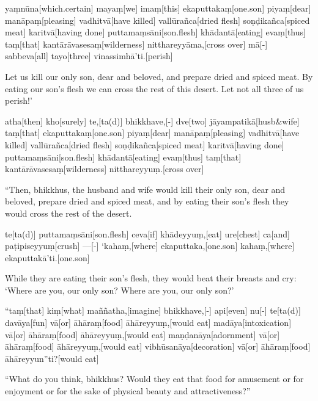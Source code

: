 \begin{samepage}
\begingl[glneveryline={\PaliGlossA,\PaliGlossB}]
yaṃnūna[which.certain] mayaṃ[we] imaṃ[this] ekaputtakaṃ[one.son] piyaṃ[dear] manāpaṃ[pleasing] vadhitvā[have killed] vallūrañca[dried flesh] soṇḍikañca[spiced meat] karitvā[having done] puttamaṃsāni[son.flesh] khādantā[eating] evaṃ[thus] taṃ[that] kantārāvasesaṃ[wilderness] nitthareyyāma,[cross over] mā[-] sabbeva[all] tayo[three] vinassimhā’ti.[perish]
\endgl
\nopagebreak
\linespread{0.5}
\begin{spacin}{0.2}
{\PaliGlossFT Let us kill our only son, dear and beloved, and prepare dried and spiced meat.  By eating our son’s flesh we can cross the rest of this desert.  Let not all three of us perish!’}
\end{spacin}
\vskip 12pt
\end{samepage}
\begin{samepage}
\begingl[glneveryline={\PaliGlossA,\PaliGlossB}]
atha[then] kho[surely] te,[ta(d)] bhikkhave,[-] dve[two] jāyampatikā[husb\&wife] taṃ[that] ekaputtakaṃ[one.son] piyaṃ[dear] manāpaṃ[pleasing] vadhitvā[have killed] vallūrañca[dried flesh] soṇḍikañca[spiced meat] karitvā[having done] puttamaṃsāni[son.flesh] khādantā[eating] evaṃ[thus] taṃ[that] kantārāvasesaṃ[wilderness] nitthareyyuṃ.[cross over]
\endgl
\nopagebreak
\linespread{0.5}
\begin{spacin}{0.2}
{\PaliGlossFT “Then, bhikkhus, the husband and wife would kill their only son, dear and beloved, prepare dried and spiced meat, and by eating their son’s flesh they would cross the rest of the desert.}
\end{spacin}
\vskip 12pt
\end{samepage}
\begin{samepage}
\begingl[glneveryline={\PaliGlossA,\PaliGlossB}]
te[ta(d)] puttamaṃsāni[son.flesh] ceva[if] khādeyyuṃ,[eat] ure[chest] ca[and] paṭipiseyyuṃ[crush] —[-] ‘kahaṃ,[where] ekaputtaka,[one.son] kahaṃ,[where] ekaputtakā’ti.[one.son]
\endgl
\nopagebreak
\linespread{0.5}
\begin{spacin}{0.2}
{\PaliGlossFT While they are eating their son’s flesh, they would beat their breasts and cry: ‘Where are you, our only son?  Where are you, our only son?’}
\end{spacin}
\vskip 12pt
\end{samepage}
\vskip 0.2in
\begin{samepage}
\begingl[glneveryline={\PaliGlossA,\PaliGlossB}]
“taṃ[that] kiṃ[what] maññatha,[imagine] bhikkhave,[-] api[even] nu[-] te[ta(d)] davāya[fun] vā[or] āhāraṃ[food] āhāreyyuṃ,[would eat] madāya[intoxication] vā[or] āhāraṃ[food] āhāreyyuṃ,[would eat] maṇḍanāya[adornment] vā[or] āhāraṃ[food] āhāreyyuṃ,[would eat] vibhūsanāya[decoration] vā[or] āhāraṃ[food] āhāreyyun”ti?[would eat]
\endgl
\nopagebreak
\linespread{0.5}
\begin{spacin}{0.2}
{\PaliGlossFT “What do you think, bhikkhus?  Would they eat that food for amusement or for enjoyment  or for the sake of physical beauty and attractiveness?”}
\end{spacin}
\vskip 12pt
\end{samepage}
